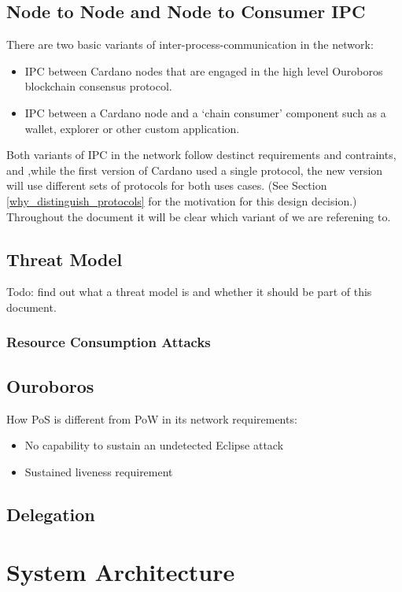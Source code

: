 \documentclass{report}
\theoremstyle{definition}{
  \newtheorem{lemma}{Lemma}[section] %
  \newtheorem{definition}[lemma]{Definition}
}
\theoremstyle{theorem}{
  \newtheorem{invariant}[lemma]{Invariant}
  \newtheorem{proofobligation}[lemma]{Proof Obligation}
}
\numberwithin{equation}{lemma}
\begin{document}
\section{Node to Node and Node to Consumer IPC}
There are two basic variants of inter-process-communication in the network:
\begin{itemize}
\item IPC between Cardano nodes that are engaged in the high level Ouroboros
      blockchain consensus protocol.
\item IPC between a Cardano node and a `chain consumer' component such as a
      wallet, explorer or other custom application.
\end{itemize}
Both variants of IPC in the network follow destinct requirements and contraints, and
,while the first version of Cardano used a single protocol, the new version will
use different sets of protocols for both uses cases.
(See Section \ref{why_distinguish_protocols} for the motivation for this design decision.)
Throughout the document it will be clear which variant of we are referening to.

\section{Threat Model}
Todo: find out what a threat model is and whether it should be part of this document.
\subsection{Resource Consumption Attacks}


\section{Ouroboros}

How PoS is different from PoW in its network requirements:

\begin{itemize}
  \item No capability to sustain an undetected Eclipse attack
  \item Sustained liveness requirement
\end{itemize}

\section{Delegation}

\chapter{System Architecture}
\end{document}
